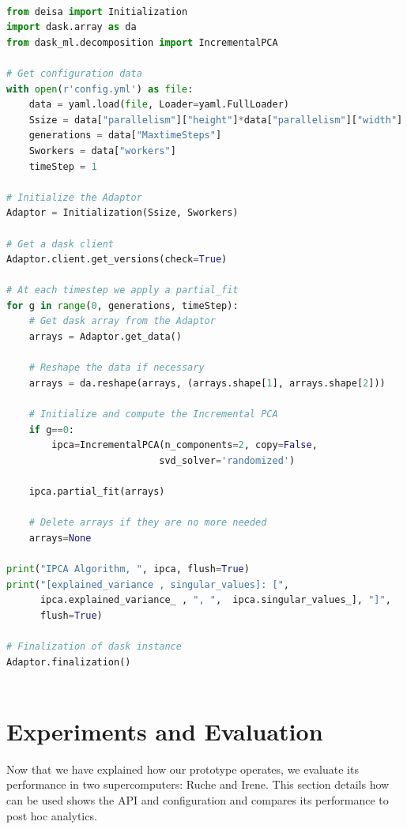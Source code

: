 \begin{lstlisting}[float=h!, label=list:deisaanalyse, language=python, caption= Deisa Client interface]

from deisa import Initialization
import dask.array as da
from dask_ml.decomposition import IncrementalPCA

# Get configuration data
with open(r'config.yml') as file:
    data = yaml.load(file, Loader=yaml.FullLoader)
    Ssize = data["parallelism"]["height"]*data["parallelism"]["width"]
    generations = data["MaxtimeSteps"]
    Sworkers = data["workers"]
    timeStep = 1

# Initialize the Adaptor 
Adaptor = Initialization(Ssize, Sworkers)

# Get a dask client 
Adaptor.client.get_versions(check=True)

# At each timestep we apply a partial_fit
for g in range(0, generations, timeStep):  
    # Get dask array from the Adaptor 
    arrays = Adaptor.get_data()

    # Reshape the data if necessary 
    arrays = da.reshape(arrays, (arrays.shape[1], arrays.shape[2])) 

    # Initialize and compute the Incremental PCA
    if g==0:
        ipca=IncrementalPCA(n_components=2, copy=False, 
                           svd_solver='randomized')

    ipca.partial_fit(arrays)

    # Delete arrays if they are no more needed
    arrays=None

print("IPCA Algorithm, ", ipca, flush=True)
print("[explained_variance , singular_values]: [", 
      ipca.explained_variance_ , ", ",  ipca.singular_values_], "]", 
      flush=True)

# Finalization of dask instance
Adaptor.finalization()
    
\end{lstlisting}

\section{Experiments and Evaluation}\label{sec:evaldeisa}
Now that we have explained how our \deisa prototype operates, we evaluate its performance in two supercomputers: Ruche and Irene. This section details how \deisa can be used shows the API and configuration and compares its performance to post hoc analytics.  


